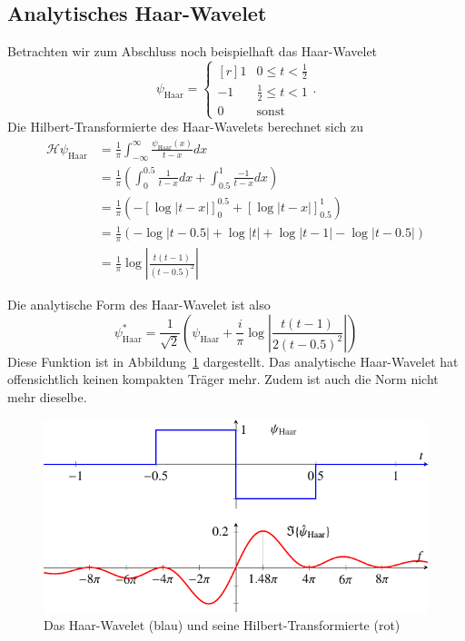 \subsection{Analytisches Haar-Wavelet}
Betrachten wir zum Abschluss noch beispielhaft das Haar-Wavelet
\[
	\psi_{\text{Haar}} = \left\lbrace\begin{matrix*}[r]
		1 & 0 \le t < \frac{1}{2} \\
		-1 & \frac{1}{2} \le t < 1 \\
		0 & \text{sonst}
	\end{matrix*} \right..
\]
Die Hilbert-Transformierte des Haar-Wavelets berechnet sich zu
\begin{align*}
	\mathcal{H} \psi_{\text{Haar}}
	&= \frac{1}{\pi} \int_{-\infty}^{\infty} \frac{\psi_{\text{Haar}}(x)}{t-x} dx\\
	&= \frac{1}{\pi}\left( \int_{0}^{0.5} \frac{1}{t-x}dx + \int_{0.5}^{1} \frac{-1}{t-x}dx \right)\\
	&= \frac{1}{\pi} \left( -\left[\log \left|t-x\right| \right]_0^{0.5} + \left[\log\left|t-x\right| \right]_{0.5}^{1} \right)\\
	&= \frac{1}{\pi} \left( -\log\left|t-0.5\right| + \log\left|t\right| + \log\left|t-1\right| - \log\left|t-0.5\right|\right)\\
	&= \frac{1}{\pi} \log\left|\frac{t(t-1)}{(t-0.5)^2}\right|
\end{align*}

Die analytische Form des Haar-Wavelet ist also
\[
 \psi^\ast_{\text{Haar}} = \frac{1}{\sqrt{2}}\left(\psi_{\text{Haar}} + \frac{i}{\pi} \log\left|\frac{t(t-1)}{2(t-0.5)^2}\right|\right)
\]
Diese Funktion ist in Abbildung~\ref{complex:haar} dargestellt.
Das analytische Haar-Wavelet hat offensichtlich keinen kompakten Träger mehr.
Zudem ist auch die Norm nicht mehr dieselbe.

\begin{figure}
	\centering
	\includegraphics{papers/complex/images/haar.pdf}
	\caption{Das Haar-Wavelet (blau) und seine Hilbert-Transformierte (rot)
		\label{complex:haar}}
\end{figure}

